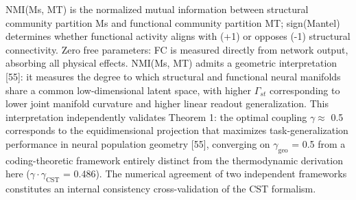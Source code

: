 \documentclass[a4paper,12pt]{article}
\begin{document}
NMI(Ms, MT) is the normalized mutual information between structural community partition Ms and functional community partition MT; sign(Mantel) determines whether functional activity aligns with (+1) or opposes (-1) structural connectivity.
Zero free parameters: FC is measured directly from network output, absorbing all physical effects.
NMI(Ms, MT) admits a geometric interpretation [55]: it measures the degree to which structural and functional neural manifolds share a common low-dimensional latent space, with higher $\Gamma_{st}$ corresponding to lower joint manifold curvature and higher linear readout generalization.
This interpretation independently validates Theorem 1: the optimal coupling $\gamma \approx$ 0.5 corresponds to the equidimensional projection that maximizes task-generalization performance in neural population geometry [55], converging on $\gamma_{\text{geo}}$ = 0.5 from a coding-theoretic framework entirely distinct from the thermodynamic derivation here ($\gamma \cdot \gamma_{\text{CST}}$ = 0.486).
The numerical agreement of two independent frameworks constitutes an internal consistency cross-validation of the CST formalism.
\end{document}
